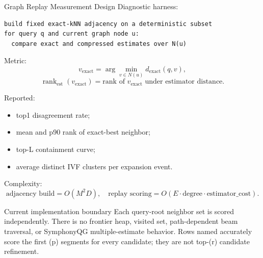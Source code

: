\documentclass[aspectratio=169,10pt]{beamer}
\newcommand{\code}[1]{\texttt{\detokenize{#1}}}
\begin{document}
\begin{frame}[fragile]{Graph Replay Measurement Design}
\scriptsize
Diagnostic harness:
\begin{lstlisting}
build fixed exact-kNN adjacency on a deterministic subset
for query q and current graph node u:
  compare exact and compressed estimates over N(u)
\end{lstlisting}

Metric:
\[
v_{\mathrm{exact}}=\arg\min_{v\in N(u)}d_{\mathrm{exact}}(q,v),
\]
\[
\operatorname{rank}_{\mathrm{est}}(v_{\mathrm{exact}})
=\text{rank of }v_{\mathrm{exact}}\text{ under estimator distance}.
\]

Reported:
\begin{itemize}
  \item top1 disagreement rate;
  \item mean and p90 rank of exact-best neighbor;
  \item top-L containment curve;
  \item average distinct IVF clusters per expansion event.
\end{itemize}

Complexity:
\[
\text{adjacency build}=O(M^2D),\quad
\text{replay scoring}=O(E\cdot \text{degree}\cdot\text{estimator\_cost}).
\]

\begin{alertblock}{Current implementation boundary}
Each query-root neighbor set is scored independently. There is no frontier
heap, visited set, path-dependent beam traversal, or SymphonyQG
multiple-estimate behavior. Rows named \code{saq_prefix_accp} accurately score
the first (p) segments for every candidate; they are not top-(r) candidate
refinement.
\end{alertblock}
\end{frame}
\end{document}
